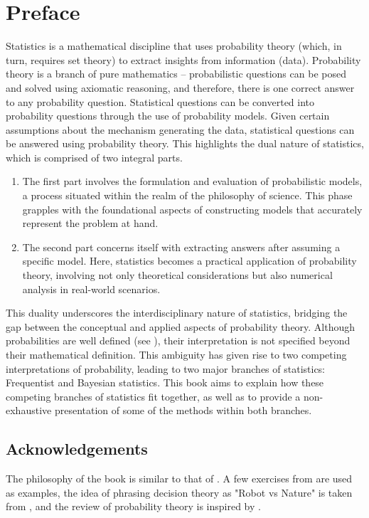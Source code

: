 \chapter{Preface}
\label{chp:preface}
Statistics is a mathematical discipline that uses probability theory (which, in turn, requires set theory) to extract insights from information (data). Probability theory is a branch of pure mathematics -- probabilistic questions can be posed and solved using axiomatic reasoning, and therefore, there is one correct answer to any probability question. Statistical questions can be converted into probability questions through the use of probability models. Given certain assumptions about the mechanism generating the data, statistical questions can be answered using probability theory. This highlights the dual nature of statistics, which is comprised of two integral parts.
\begin{enumerate}
	\item The first part involves the formulation and evaluation of probabilistic models, a process situated within the realm of the philosophy of science. This phase grapples with the foundational aspects of constructing models that accurately represent the problem at hand.
	\item The second part concerns itself with extracting answers after assuming a specific model. Here, statistics becomes a practical application of probability theory, involving not only theoretical considerations but also numerical analysis in real-world scenarios.
\end{enumerate}
This duality underscores the interdisciplinary nature of statistics, bridging the gap between the conceptual and applied aspects of probability theory. Although probabilities are well defined (see ), their interpretation is not specified beyond their mathematical definition. This ambiguity has given rise to two competing interpretations of probability, leading to two major branches of statistics: Frequentist and Bayesian statistics. This book aims to explain how these competing branches of statistics fit together, as well as to provide a non-exhaustive presentation of some of the methods within both branches. 

\section{Acknowledgements}
The philosophy of the book is similar to that of \cite{Sivia2006}. A few exercises from \cite{murphy2023probabilistic} are used as examples, the idea of phrasing decision theory as "Robot vs Nature" is taken from \cite{lavalle2006planning}, and the review of probability theory is inspired by \cite{chan2021introduction}.